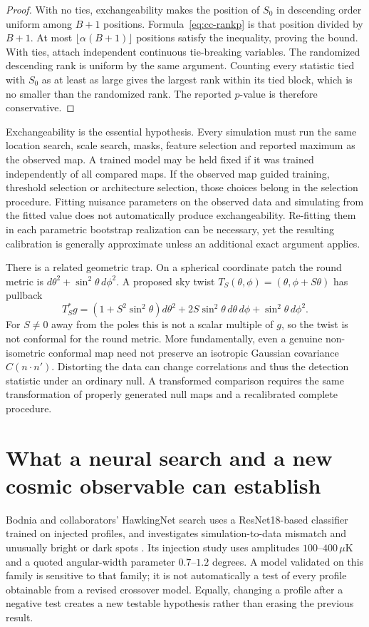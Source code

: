 \begin{proof}
With no ties, exchangeability makes the position of $S_0$ in descending
order uniform among $B+1$ positions. Formula~\eqref{eq:cc-rankp} is that
position divided by $B+1$. At most $\lfloor\alpha(B+1)\rfloor$
positions satisfy the inequality, proving the bound. With ties, attach
independent continuous tie-breaking variables. The randomized descending
rank is uniform by the same argument. Counting every statistic tied
with $S_0$ as at least as large gives the largest rank within its tied
block, which is no smaller than the randomized rank. The reported
$p$-value is therefore conservative.
\end{proof}

Exchangeability is the essential hypothesis. Every simulation must run
the same location search, scale search, masks, feature selection and
reported maximum as the observed map. A trained model may be held fixed
if it was trained independently of all compared maps. If the observed
map guided training, threshold selection or architecture selection, those
choices belong in the selection procedure. Fitting nuisance parameters
on the observed data and simulating from the fitted value does not
automatically produce exchangeability. Re-fitting them in each parametric
bootstrap realization can be necessary, yet the resulting calibration
is generally approximate unless an additional exact argument applies.

There is a related geometric trap. On a spherical coordinate patch the
round metric is $d\theta^2+\sin^2\theta\,d\phi^2$. A proposed sky twist
$T_S(\theta,\phi)=(\theta,\phi+S\theta)$ has pullback
\[
 T_S^*g=(1+S^2\sin^2\theta)d\theta^2
 +2S\sin^2\theta\,d\theta\,d\phi+\sin^2\theta\,d\phi^2.
\]
For $S\ne0$ away from the poles this is not a scalar multiple of $g$,
so the twist is not conformal for the round metric. More fundamentally,
even a genuine non-isometric conformal map need not preserve an
isotropic Gaussian covariance $C(n\cdot n')$. Distorting the data can
change correlations and thus the detection statistic under an ordinary
null. A transformed comparison requires the same transformation of
properly generated null maps and a recalibrated complete procedure.

\section{What a neural search and a new cosmic observable can establish}

Bodnia and collaborators' HawkingNet search uses a ResNet18-based
classifier trained on injected profiles, and investigates simulation-to-data
mismatch and unusually bright or dark spots
\citep[Sec.~4 and App.~A]{CCBodniaEtAl2024}. Its injection study uses
amplitudes $100$--$400\,\mu\mathrm K$ and a quoted angular-width parameter
$0.7$--$1.2$ degrees. A model validated on this family is sensitive to
that family; it is not automatically a test of every profile obtainable
from a revised crossover model. Equally, changing a profile after a
negative test creates a new testable hypothesis rather than erasing the
previous result.


